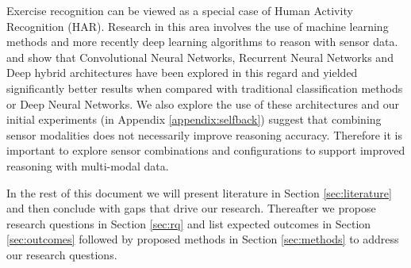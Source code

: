 Exercise recognition can be viewed as a special case of Human Activity Recognition (HAR). Research in this area involves the use of machine learning methods and more recently deep learning algorithms to reason with sensor data.  and  show that Convolutional Neural Networks, Recurrent Neural Networks and Deep hybrid architectures have been explored in this regard and yielded significantly better results when compared with traditional classification methods or Deep Neural Networks. We also explore the use of these architectures and our initial experiments (in Appendix \ref{appendix:selfback}) suggest that combining sensor modalities does not necessarily improve reasoning accuracy. Therefore it is important to explore sensor combinations and configurations to support improved reasoning with multi-modal data.  

In the rest of this document we will present literature in Section \ref{sec:literature} and then conclude with gaps that drive our research. Thereafter we propose research questions in Section \ref{sec:rq} and list expected outcomes in Section \ref{sec:outcomes} followed by proposed methods in Section \ref{sec:methods} to address our research questions. 